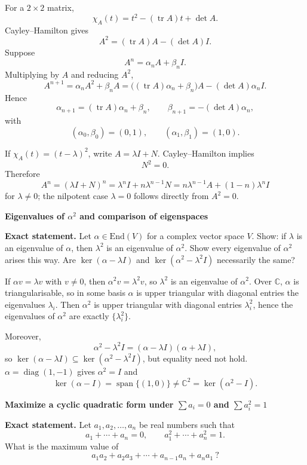 \begin{solution}
For a \(2\times2\) matrix,
\[
\chi_A(t)=t^2-(\operatorname{tr}A)t+\det A.
\]
Cayley--Hamilton gives
\[
A^2=(\operatorname{tr}A)A-(\det A)I.
\]
Suppose
\[
A^n=\alpha_nA+\beta_nI.
\]
Multiplying by \(A\) and reducing \(A^2\),
\[
A^{n+1}
=\alpha_nA^2+\beta_nA
=\bigl((\operatorname{tr}A)\alpha_n+\beta_n\bigr)A
-(\det A)\alpha_n I.
\]
Hence
\[
\alpha_{n+1}=(\operatorname{tr}A)\alpha_n+\beta_n,
\qquad
\beta_{n+1}=-(\det A)\alpha_n,
\]
with
\[
(\alpha_0,\beta_0)=(0,1),\qquad
(\alpha_1,\beta_1)=(1,0).
\]

If \(\chi_A(t)=(t-\lambda)^2\), write \(A=\lambda I+N\). Cayley--Hamilton implies
\[
N^2=0.
\]
Therefore
\[
A^n=(\lambda I+N)^n
=\lambda^nI+n\lambda^{n-1}N
=n\lambda^{n-1}A+(1-n)\lambda^nI
\]
for \(\lambda\neq0\); the nilpotent case \(\lambda=0\) follows directly from \(A^2=0\).
\end{solution}

\begin{problem}[CP-I-0040]
\label{prob:cp-i-0040}
\textbf{Eigenvalues of $\alpha^2$ and comparison of eigenspaces}

\textbf{Exact statement.}
\hspace*{1.5em}Let $\alpha\in\mathrm{End}(V)$ for a complex vector space $V$.
Show: if $\lambda$ is an eigenvalue of $\alpha$, then $\lambda^2$ is an eigenvalue of $\alpha^2$.
Show every eigenvalue of $\alpha^2$ arises this way.
Are $\ker(\alpha-\lambda I)$ and $\ker(\alpha^2-\lambda^2 I)$ necessarily the same?

\end{problem}

\begin{solution}
If $\alpha v=\lambda v$ with $v\neq 0$, then $\alpha^2v=\lambda^2v$, so $\lambda^2$ is an eigenvalue of $\alpha^2$.
Over $\mathbb C$, $\alpha$ is triangularisable, so in some basis $\alpha$ is upper triangular with diagonal entries the eigenvalues $\lambda_i$.
Then $\alpha^2$ is upper triangular with diagonal entries $\lambda_i^2$, hence the eigenvalues of $\alpha^2$ are exactly $\{\lambda_i^2\}$.

Moreover,
\[
\alpha^2-\lambda^2 I=(\alpha-\lambda I)(\alpha+\lambda I),
\]
so $\ker(\alpha-\lambda I)\subseteq \ker(\alpha^2-\lambda^2 I)$, but equality need not hold.
$\alpha=\operatorname{diag}(1,-1)$ gives $\alpha^2=I$ and
\[
\ker(\alpha-I)=\operatorname{span}\{(1,0)\}\neq \mathbb C^2=\ker(\alpha^2-I).
\]
\end{solution}

\begin{problem}[CP-I-0042]
\label{prob:cp-i-0042}
\textbf{Maximize a cyclic quadratic form under $\sum a_i=0$ and $\sum a_i^2=1$}

\textbf{Exact statement.}
\hspace*{1.5em}Let $a_1,a_2,\dots,a_n$ be real numbers such that
\[
a_1+\cdots+a_n=0,\qquad a_1^2+\cdots+a_n^2=1.
\]
What is the maximum value of
\[
a_1a_2+a_2a_3+\cdots+a_{n-1}a_n+a_na_1\ ?
\]
\end{problem}

